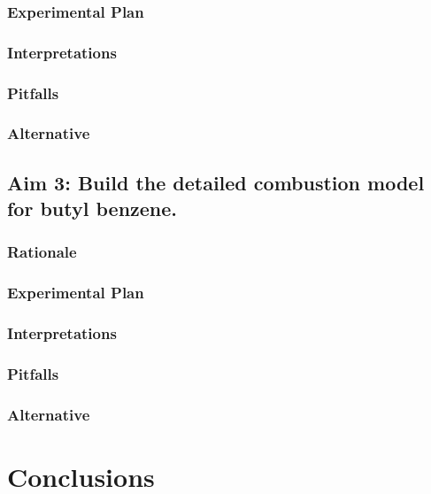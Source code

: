 \documentclass[12pt]{article}
\begin{document}
\subsubsection{Experimental Plan}
\subsubsection{Interpretations}
\subsubsection{Pitfalls}
\subsubsection{Alternative}

\subsection{Aim 3: Build the detailed combustion model for butyl benzene.}



\subsubsection{Rationale}
\subsubsection{Experimental Plan}
\subsubsection{Interpretations}
\subsubsection{Pitfalls}
\subsubsection{Alternative}


\section{Conclusions}
\end{document}
